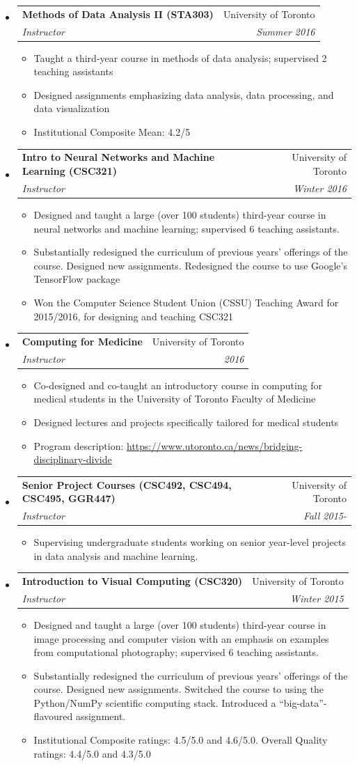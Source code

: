 \documentclass[letterpaper,11pt]{article}
\makeatletter
\newcommand{\resitem}[1]{\item #1 \vspace{-2pt}}
\newcommand{\ressubheading}[4]{
\begin{tabular*}{\linewidth}[t]{l@{\extracolsep{\fill}}r}
		\textbf{#1} & #2 \\
		\textit{\textcolor{accent}{#3}} & \textit{#4} \\
\end{tabular*}\vspace{-2pt}}
\makeatother
\begin{document}
\begin{itemize}
\item
	\ressubheading{Methods of Data Analysis II (STA303)}{University of Toronto}{Instructor}{Summer 2016}
	\begin{itemize}
		\resitem{Taught a third-year course in methods of data analysis; supervised 2 teaching assistants}
		\resitem{Designed assignments emphasizing data analysis, data processing, and data visualization}
		\resitem{Institutional Composite Mean: 4.2/5}
	\end{itemize}
	\item
	\ressubheading{Intro to Neural Networks and Machine Learning (CSC321)}{University of Toronto}{Instructor}{Winter 2016}
	\begin{itemize}
		\resitem{Designed and taught a large (over 100 students) third-year course in neural networks and machine learning; supervised 6 teaching assistants.}
		\resitem{Substantially redesigned the curriculum of previous years' offerings of the course. Designed new assignments. Redesigned the course to use Google's TensorFlow package}
		\resitem{Won the Computer Science Student Union (CSSU) Teaching Award for 2015/2016, for designing and teaching CSC321}
	\end{itemize}
\item 
	\ressubheading{Computing for Medicine}{University of Toronto}{Instructor}{2016}
	\begin{itemize}
		\resitem{Co-designed and co-taught an introductory course in computing for medical students in the University of Toronto Faculty of Medicine}
		\resitem{Designed lectures and projects specifically tailored for medical students}
		\resitem{Program description: \url{https://www.utoronto.ca/news/bridging-disciplinary-divide}}
	\end{itemize}
\item 
	\ressubheading{Senior Project Courses (CSC492, CSC494, CSC495, GGR447)}{University of Toronto}{Instructor}{Fall 2015-}
	\begin{itemize}
		\resitem{Supervising undergraduate students working on senior year-level projects in data analysis and machine learning.}
	\end{itemize}
\item
	\ressubheading{Introduction to Visual Computing (CSC320)}{University of Toronto}{Instructor}{Winter 2015}
	\begin{itemize}
		\resitem{Designed and taught a large (over 100 students) third-year course in image processing and computer vision with an emphasis on examples from computational photography; supervised 6 teaching assistants.}
		\resitem{Substantially redesigned the curriculum of previous years' offerings of the course. Designed new assignments. Switched the course to using the Python/NumPy scientific computing stack. Introduced a ``big-data''-flavoured assignment. }
		\resitem{Institutional Composite ratings: 4.5/5.0 and 4.6/5.0. Overall Quality ratings:  4.4/5.0 and 4.3/5.0}
	\end{itemize}


\end{itemize}
\end{document}
